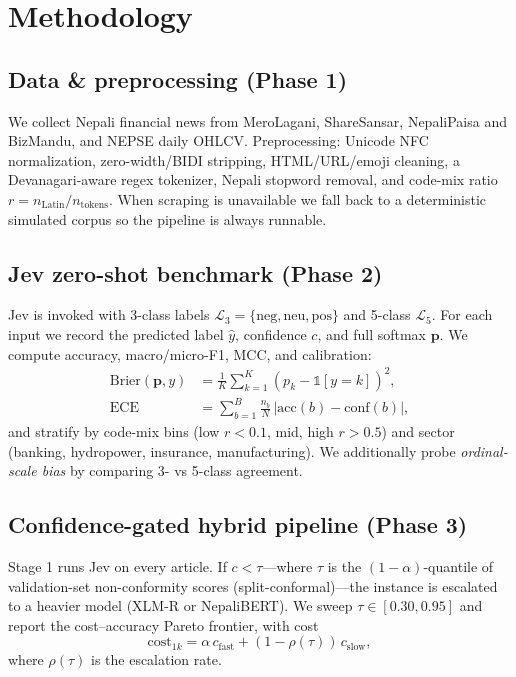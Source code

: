 \documentclass[conference]{IEEEtran}
\begin{document}
\section{Methodology}\label{sec:method}
\subsection{Data \& preprocessing (Phase 1)}
We collect Nepali financial news from MeroLagani, ShareSansar, NepaliPaisa
and BizMandu, and NEPSE daily OHLCV. Preprocessing: Unicode NFC
normalization, zero-width/BIDI stripping, HTML/URL/emoji cleaning, a
Devanagari-aware regex tokenizer, Nepali stopword removal, and code-mix
ratio $r = n_{\text{Latin}} / n_{\text{tokens}}$. When scraping is
unavailable we fall back to a deterministic simulated corpus so the
pipeline is always runnable.

\subsection{Jev zero-shot benchmark (Phase 2)}
Jev is invoked with 3-class labels
$\mathcal{L}_3=\{\text{neg},\text{neu},\text{pos}\}$ and 5-class
$\mathcal{L}_5$. For each input we record the predicted label
$\hat{y}$, confidence $c$, and full softmax $\mathbf{p}$. We compute
accuracy, macro/micro-F1, MCC, and calibration:
\begin{align}
\text{Brier}(\mathbf{p},y) &= \frac{1}{K}\sum_{k=1}^{K}(p_k - \mathbb{1}[y=k])^2,\\
\text{ECE} &= \sum_{b=1}^{B}\frac{n_b}{N}\,|\text{acc}(b) - \text{conf}(b)|,
\end{align}
and stratify by code-mix bins (low $r<0.1$, mid, high $r>0.5$) and sector
(banking, hydropower, insurance, manufacturing). We additionally probe
\emph{ordinal-scale bias} by comparing 3- vs 5-class agreement.

\subsection{Confidence-gated hybrid pipeline (Phase 3)}
Stage 1 runs Jev on every article. If $c < \tau$---where $\tau$ is the
$(1-\alpha)$-quantile of validation-set non-conformity scores
(split-conformal)---the instance is escalated to a heavier model (XLM-R or
NepaliBERT). We sweep $\tau\in[0.30,0.95]$ and report the cost--accuracy
Pareto frontier, with cost
\begin{equation}
\text{cost}_{1k} = \alpha\, c_{\text{fast}} + (1-\rho(\tau))\, c_{\text{slow}},
\end{equation}
where $\rho(\tau)$ is the escalation rate.
\end{document}
